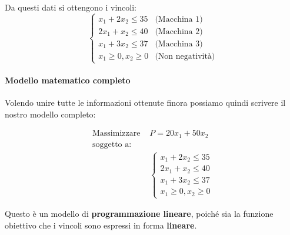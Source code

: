 Da questi dati si ottengono i vincoli:
\begin{equation}
\begin{cases}
x_1 + 2x_2 \leq 35 & \text{(Macchina 1)} \\
2x_1 + x_2 \leq 40 & \text{(Macchina 2)} \\
x_1 + 3x_2 \leq 37 & \text{(Macchina 3)} \\
x_1 \geq 0, x_2 \geq 0 & \text{(Non negatività)}
\end{cases}
\end{equation}

\paragraph{\textbf{Modello matematico completo}}
Volendo unire tutte le informazioni ottenute finora possiamo quindi scrivere il nostro modello completo:

\begin{align*}
\text{Massimizzare } & P=20x_1+50x_2 \\
\text{soggetto a: } & \\
& \begin{cases}
x_1+2x_2 \leq 35 \\
2x_1+x_2 \leq 40 \\
x_1+3x_2 \leq 37 \\
x_1 \geq 0, x_2 \geq 0
\end{cases}
\end{align*}

Questo è un modello di \textbf{programmazione lineare}, poiché sia la funzione obiettivo che i vincoli sono espressi in forma \textbf{lineare}.